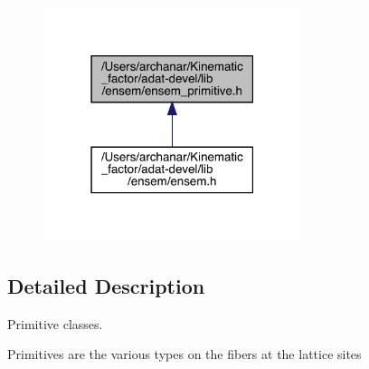 \begin{figure}[H]
\begin{center}
\leavevmode
\includegraphics[width=214pt]{da/d97/adat-devel_2lib_2ensem_2ensem__primitive_8h__dep__incl}
\end{center}
\end{figure}


\subsection{Detailed Description}
Primitive classes. 

Primitives are the various types on the fibers at the lattice sites 